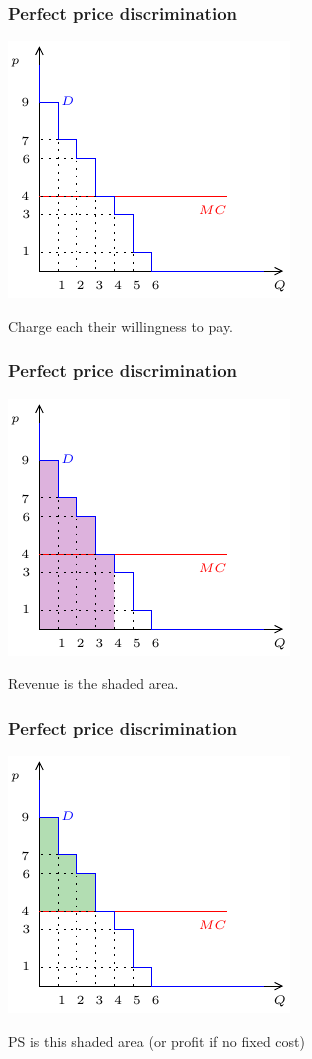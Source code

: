 \documentclass[xcolor=pdftex,dvipsnames]{beamer}
\begin{document}
\begin{frame}
\frametitle{Perfect price discrimination}
\begin{center}
  \includegraphics{pics/Pricediscrimination3}
\end{center}
Charge each their willingness to pay.
\end{frame}

\begin{frame}
\frametitle{Perfect price discrimination}
\begin{center}
  \includegraphics{pics/Pricediscrimination4}
\end{center}
Revenue is the shaded area.
\end{frame}
\begin{frame}
\frametitle{Perfect price discrimination}
\begin{center}
  \includegraphics{pics/Pricediscrimination5}
\end{center}
PS is this shaded area (or profit if no fixed cost)
\end{frame}
\end{document}
